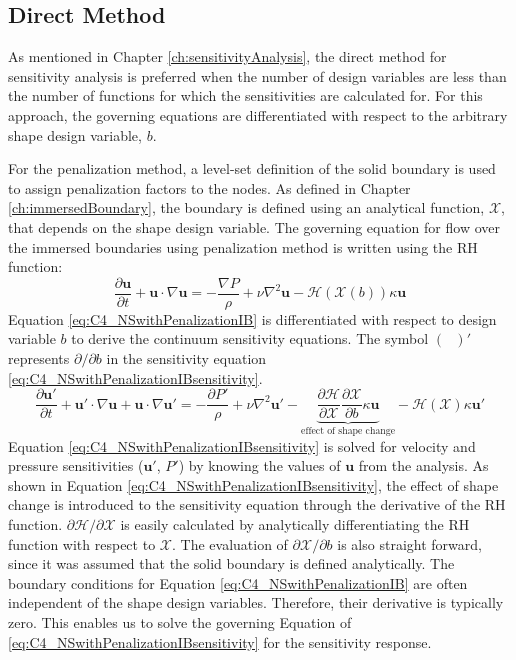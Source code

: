 \subsection{Direct Method}
As mentioned in Chapter \ref{ch:sensitivityAnalysis}, the direct method for sensitivity analysis is preferred when the number of design variables are less than the number of functions for which the sensitivities are calculated for. For this approach, the governing equations are differentiated with respect to the arbitrary shape design variable, $b$.

For the penalization method, a level-set definition of the solid boundary is used to assign penalization factors to the nodes. As defined in Chapter \ref{ch:immersedBoundary}, the boundary is defined using an analytical function, $\mathcal{X}$, that depends on the shape design variable. The governing equation for flow over the immersed boundaries using penalization method is written using the RH function:
%
\begin{equation}\label{eq:C4_NSwithPenalizationIB}
    \frac{\partial \mathbf{u}}{\partial t} + \mathbf{u} \cdot \nabla \mathbf{u} = 
    -\frac{\nabla P}{\rho} + \nu \nabla^2 \mathbf{u} -\mathcal{H}(\mathcal{X}(b)) \kappa \mathbf{u}
\end{equation}
%
Equation \eqref{eq:C4_NSwithPenalizationIB} is differentiated with respect to design variable $b$ to derive the continuum sensitivity equations. The symbol $(\text{ })'$ represents $\partial /\partial b$ in the sensitivity equation \eqref{eq:C4_NSwithPenalizationIBsensitivity}.
%
\begin{equation}\label{eq:C4_NSwithPenalizationIBsensitivity}
    \frac{\partial \mathbf{u}'}{\partial t} +
    \mathbf{u}' \cdot \nabla \mathbf{u} + \mathbf{u} \cdot \nabla \mathbf{u}' = 
    -\frac{\partial P'}{\rho} + 
    \nu \nabla^2 \mathbf{u}' - 
    \underbrace{\frac{\partial \mathcal{H}}{\partial \mathcal{X}} \frac{\partial \mathcal{X}}{\partial b} \kappa \mathbf{u}}_\text{effect of shape change} - 
    \mathcal{H}(\mathcal{X}) \kappa \mathbf{u}'
\end{equation}
%
Equation \eqref{eq:C4_NSwithPenalizationIBsensitivity} is solved for velocity and pressure sensitivities ($\mathbf{u}'$, $P'$) by knowing the values of $\mathbf{u}$ from the analysis. As shown in Equation \eqref{eq:C4_NSwithPenalizationIBsensitivity}, the effect of shape change is introduced to the sensitivity equation through the derivative of the RH function. $\partial \mathcal{H}/\partial \mathcal{X}$ is easily calculated by analytically differentiating the RH function with respect to $\mathcal{X}$. The evaluation of $\partial \mathcal{X}/\partial b$ is also straight forward, since it was assumed that the solid boundary is defined analytically. The boundary conditions for Equation \eqref{eq:C4_NSwithPenalizationIB} are often independent of the shape design variables. Therefore, their derivative is typically zero. This enables us to solve the governing Equation of \eqref{eq:C4_NSwithPenalizationIBsensitivity} for the sensitivity response.

